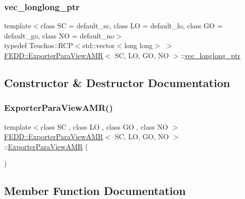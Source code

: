 \subsubsection{\texorpdfstring{vec\+\_\+longlong\+\_\+ptr}{vec\_longlong\_ptr}}
{\footnotesize\ttfamily template$<$class SC  = default\+\_\+sc, class LO  = default\+\_\+lo, class GO  = default\+\_\+go, class NO  = default\+\_\+no$>$ \\
typedef Teuchos\+::\+R\+CP$<$std\+::vector$<$long long$>$ $>$ \hyperlink{classFEDD_1_1ExporterParaViewAMR}{F\+E\+D\+D\+::\+Exporter\+Para\+View\+A\+MR}$<$ SC, LO, GO, NO $>$\+::\hyperlink{classFEDD_1_1ExporterParaViewAMR_a48d0c5c5de711255407680b44226ce70}{vec\+\_\+longlong\+\_\+ptr}}



\subsection{Constructor \& Destructor Documentation}
\mbox{\label{classFEDD_1_1ExporterParaViewAMR_aef1563dbd4a39229e953528d096f46f7}} 
\subsubsection{\texorpdfstring{Exporter\+Para\+View\+A\+M\+R()}{ExporterParaViewAMR()}}
{\footnotesize\ttfamily template$<$class SC , class LO , class GO , class NO $>$ \\
\hyperlink{classFEDD_1_1ExporterParaViewAMR}{F\+E\+D\+D\+::\+Exporter\+Para\+View\+A\+MR}$<$ SC, LO, GO, NO $>$\+::\hyperlink{classFEDD_1_1ExporterParaViewAMR}{Exporter\+Para\+View\+A\+MR} (\begin{DoxyParamCaption}{ }\end{DoxyParamCaption})}



\subsection{Member Function Documentation}
\mbox{\label{classFEDD_1_1ExporterParaViewAMR_af09a245685a0f2b4e7c7972edce4043d}} 
